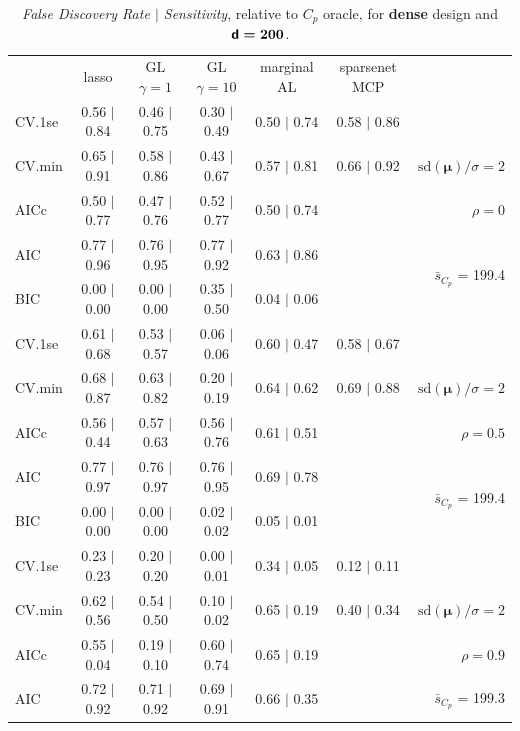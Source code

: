 \documentclass[12pt]{article}
\newcommand{\mr}[1]{\mathrm{#1}}
\newcommand{\bm}[1]{\mathbf{#1}}
\begin{document}
\begin{table}[p]\vspace{-.5cm}
\caption[l]{ {\it False Discovery Rate $\mid$ Sensitivity}, 
relative to $C_p$ oracle, for {\bf dense} design and $\boldsymbol{{\sf d}=200}$.}
\vspace{-.5cm}
\small{}
\begin{center}
\begin{tabular}{l*{5}{c}|r}
 & lasso & GL $\gamma=1$ & GL $\gamma=10$ & marginal AL & sparsenet MCP  & \\
 \cline{1-7}
CV.1se & 0.56 $\mid$ 0.84 & 0.46 $\mid$ 0.75 & 0.30 $\mid$ 0.49 & 0.50 $\mid$ 0.74 & 0.58 $\mid$ 0.86 &\\
CV.min & 0.65 $\mid$ 0.91 & 0.58 $\mid$ 0.86 & 0.43 $\mid$ 0.67 & 0.57 $\mid$ 0.81 & 0.66 $\mid$ 0.92 &  $\mr{sd}(\bm{\mu})/\sigma=2$ \\
AICc & 0.50 $\mid$ 0.77 & 0.47 $\mid$ 0.76 & 0.52 $\mid$ 0.77 & 0.50 $\mid$ 0.74 & & $\rho=0$ \\
AIC & 0.77 $\mid$ 0.96 & 0.76 $\mid$ 0.95 & 0.77 $\mid$ 0.92 & 0.63 $\mid$ 0.86 & & \multirow{2}{*}{$\bar{s}_{C_p}$ = 199.4} \\
BIC & 0.00 $\mid$ 0.00 & 0.00 $\mid$ 0.00 & 0.35 $\mid$ 0.50 & 0.04 $\mid$ 0.06 & & \\
 \hline 
CV.1se & 0.61 $\mid$ 0.68 & 0.53 $\mid$ 0.57 & 0.06 $\mid$ 0.06 & 0.60 $\mid$ 0.47 & 0.58 $\mid$ 0.67 &\\
CV.min & 0.68 $\mid$ 0.87 & 0.63 $\mid$ 0.82 & 0.20 $\mid$ 0.19 & 0.64 $\mid$ 0.62 & 0.69 $\mid$ 0.88 &  $\mr{sd}(\bm{\mu})/\sigma=2$ \\
AICc & 0.56 $\mid$ 0.44 & 0.57 $\mid$ 0.63 & 0.56 $\mid$ 0.76 & 0.61 $\mid$ 0.51 & & $\rho=0.5$ \\
AIC & 0.77 $\mid$ 0.97 & 0.76 $\mid$ 0.97 & 0.76 $\mid$ 0.95 & 0.69 $\mid$ 0.78 & & \multirow{2}{*}{$\bar{s}_{C_p}$ = 199.4} \\
BIC & 0.00 $\mid$ 0.00 & 0.00 $\mid$ 0.00 & 0.02 $\mid$ 0.02 & 0.05 $\mid$ 0.01 & & \\
 \hline 
CV.1se & 0.23 $\mid$ 0.23 & 0.20 $\mid$ 0.20 & 0.00 $\mid$ 0.01 & 0.34 $\mid$ 0.05 & 0.12 $\mid$ 0.11 &\\
CV.min & 0.62 $\mid$ 0.56 & 0.54 $\mid$ 0.50 & 0.10 $\mid$ 0.02 & 0.65 $\mid$ 0.19 & 0.40 $\mid$ 0.34 &  $\mr{sd}(\bm{\mu})/\sigma=2$ \\
AICc & 0.55 $\mid$ 0.04 & 0.19 $\mid$ 0.10 & 0.60 $\mid$ 0.74 & 0.65 $\mid$ 0.19 & & $\rho=0.9$ \\
AIC & 0.72 $\mid$ 0.92 & 0.71 $\mid$ 0.92 & 0.69 $\mid$ 0.91 & 0.66 $\mid$ 0.35 & & \multirow{2}{*}{$\bar{s}_{C_p}$ = 199.3} \\

\end{tabular}
\end{center}
\end{table}
\end{document}
